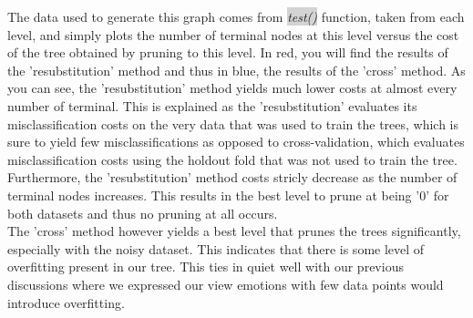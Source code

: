 \newpage

The data used to generate this graph comes from  \colorbox{lightgray}{\emph{test()}} function,
taken from each level, and simply plots the number of terminal nodes at this level versus
the cost of the tree obtained by pruning to this level.
In red, you will find the results of the 'resubstitution' method and thus in blue, the results of the 'cross' method.
As you can see, the 'resubstitution' method yields much lower costs at almost every number of terminal.
This is explained as the 'resubstitution' evaluates its misclassification costs on the very data that was used to train
the trees, which is sure to yield few misclassifications as opposed to cross-validation, which evaluates misclassification costs
using the holdout fold that was not used to train the tree.
Furthermore, the 'resubstitution' method costs stricly decrease as the number of terminal nodes increases.
This results in the best level to prune at being '0' for both datasets and thus no pruning at all occurs.\\
The 'cross' method however yields a best level that prunes the trees significantly, especially with the noisy dataset.
This indicates that there is some level of overfitting present in our tree. This ties in quiet well with our previous discussions
where we expressed our view emotions with few data points would introduce overfitting.
